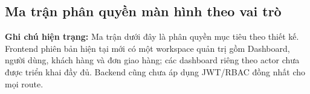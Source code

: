 \subsection{Ma trận phân quyền màn hình theo vai trò}

\textbf{Ghi chú hiện trạng:} Ma trận dưới đây là phân quyền mục tiêu theo thiết kế. Frontend phiên bản hiện tại mới có một workspace quản trị gồm Dashboard, người dùng, khách hàng và đơn giao hàng; các dashboard riêng theo actor chưa được triển khai đầy đủ. Backend cũng chưa áp dụng JWT/RBAC đồng nhất cho mọi route.

\begin{table}[H]
\centering

\caption{Ma trận phân quyền màn hình theo vai trò}
\label{tab:screen-permission}

\renewcommand{\arraystretch}{1.4}

\end{table}
